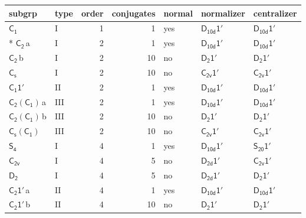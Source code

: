 \documentclass[10pt,a4paper]{article}
\numberwithin{equation}{section}
\newcommand{\grp}[1]{\mathsf{#1}}
\newcommand{\clsletter}[1]{\,{\scriptsize\color{black!55}#1}}
\begin{document}
{\small\begin{longtable}{@{}llrrlll@{}}\toprule
subgrp & type & order & conjugates & normal & normalizer & centralizer\\\midrule\endhead
\bottomrule\endfoot\endlastfoot
\href{../../../rotation/data/pdf/C1.pdf}{$\grp{C_{1}}$} & I & 1 & 1 & yes & \href{D10d-1p.pdf}{$\grp{D_{10d}1'}$} & \href{D10d-1p.pdf}{$\grp{D_{10d}1'}$}\\*
\href{../../../rotation/data/pdf/C2.pdf}{$\grp{C_{2}}$}\clsletter{a} & I & 2 & 1 & yes & \href{D10d-1p.pdf}{$\grp{D_{10d}1'}$} & \href{D10d-1p.pdf}{$\grp{D_{10d}1'}$}\\
\href{../../../rotation/data/pdf/C2.pdf}{$\grp{C_{2}}$}\clsletter{b} & I & 2 & 10 & no & \href{D2-1p.pdf}{$\grp{D_{2}1'}$} & \href{D2-1p.pdf}{$\grp{D_{2}1'}$}\\
\href{../../../rotation/data/pdf/C1v.pdf}{$\grp{C_{s}}$} & I & 2 & 10 & no & \href{C2v-1p.pdf}{$\grp{C_{2v}1'}$} & \href{C2v-1p.pdf}{$\grp{C_{2v}1'}$}\\
\href{C1-1p.pdf}{$\grp{C_{1}1'}$} & II & 2 & 1 & yes & \href{D10d-1p.pdf}{$\grp{D_{10d}1'}$} & \href{D10d-1p.pdf}{$\grp{D_{10d}1'}$}\\
\href{C2-C1.pdf}{$\grp{C_{2}}(\grp{C_{1}})$}\clsletter{a} & III & 2 & 1 & yes & \href{D10d-1p.pdf}{$\grp{D_{10d}1'}$} & \href{D10d-1p.pdf}{$\grp{D_{10d}1'}$}\\
\href{C2-C1.pdf}{$\grp{C_{2}}(\grp{C_{1}})$}\clsletter{b} & III & 2 & 10 & no & \href{D2-1p.pdf}{$\grp{D_{2}1'}$} & \href{D2-1p.pdf}{$\grp{D_{2}1'}$}\\
\href{C1v-C1.pdf}{$\grp{C_{s}}(\grp{C_{1}})$} & III & 2 & 10 & no & \href{C2v-1p.pdf}{$\grp{C_{2v}1'}$} & \href{C2v-1p.pdf}{$\grp{C_{2v}1'}$}\\
\href{../../../rotation/data/pdf/S4.pdf}{$\grp{S_{4}}$} & I & 4 & 1 & yes & \href{D10d-1p.pdf}{$\grp{D_{10d}1'}$} & \href{S20-1p.pdf}{$\grp{S_{20}1'}$}\\
\href{../../../rotation/data/pdf/C2v.pdf}{$\grp{C_{2v}}$} & I & 4 & 5 & no & \href{D2d-1p.pdf}{$\grp{D_{2d}1'}$} & \href{C2v-1p.pdf}{$\grp{C_{2v}1'}$}\\
\href{../../../rotation/data/pdf/D2.pdf}{$\grp{D_{2}}$} & I & 4 & 5 & no & \href{D2d-1p.pdf}{$\grp{D_{2d}1'}$} & \href{D2-1p.pdf}{$\grp{D_{2}1'}$}\\
\href{C2-1p.pdf}{$\grp{C_{2}1'}$}\clsletter{a} & II & 4 & 1 & yes & \href{D10d-1p.pdf}{$\grp{D_{10d}1'}$} & \href{D10d-1p.pdf}{$\grp{D_{10d}1'}$}\\
\href{C2-1p.pdf}{$\grp{C_{2}1'}$}\clsletter{b} & II & 4 & 10 & no & \href{D2-1p.pdf}{$\grp{D_{2}1'}$} & \href{D2-1p.pdf}{$\grp{D_{2}1'}$}\\

\end{longtable}}
\end{document}
